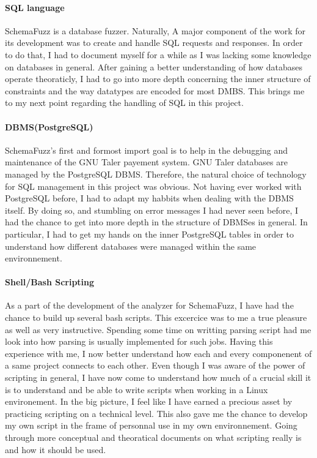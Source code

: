 \documentclass{article}
\begin{document}
			\paragraph{SQL language}
SchemaFuzz is a database fuzzer. Naturally, A major component of the work for its development was to create and handle SQL requests and responses. In order to do that, I had to document myself for a while as I was lacking some knowledge on databases in general. After gaining a better understanding of how databases operate theoraticly, I had to go into more depth concerning the inner structure of constraints and the way datatypes are encoded for most DMBS.
This brings me to my next point regarding the handling of SQL in this project.

			\paragraph{DBMS(PostgreSQL)} 
SchemaFuzz's first and formost import goal is to help in the debugging and maintenance of the GNU Taler payement system. GNU Taler databases are managed by the PostgreSQL DBMS. Therefore, the natural choice of technology for SQL management in this project was obvious.
Not having ever worked with PostgreSQL before, I had to adapt my habbits when dealing with the DBMS itself.
By doing so, and stumbling on error messages I had never seen before, I had the chance to get into more depth in the structure of DBMSes in general. In particular, I had to get my hands on the inner PostgreSQL tables in order to understand how different databases were managed within the same environnement.

			\paragraph{Shell/Bash Scripting} 
As a part of the development of the analyzer for SchemaFuzz, I have had the chance to build up several bash scripts. This excercice was to me a true pleasure as well as very instructive.
Spending some time on writting parsing script had me look into how parsing is usually implemented for such jobs.
Having this experience with me, I now better understand how each and every componenent of a same project connects to each other. 
Even though I was aware of the power of scripting in general, I have now come to understand how much of a crucial skill it is to understand and be able to write scripts when working in a Linux environement.
In the big picture, I feel like I have earned a precious asset by practicing scripting on a technical level. This also gave me the chance to develop my own script in the frame of personnal use in my own environnement. Going through more conceptual and theoratical documents on what scripting really is and how it should be used.
   			
\end{document}
